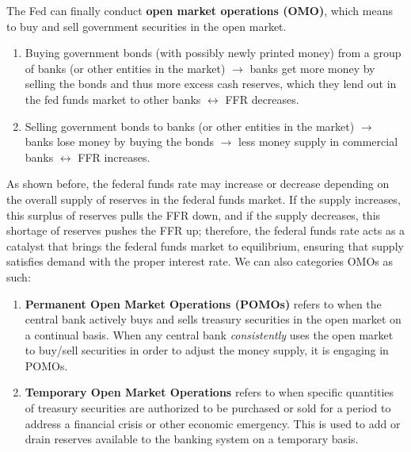 \documentclass{article}
\begin{document}
    \begin{definition}
      \label{def:open-market-operations}
      The Fed can finally conduct \textbf{open market operations (OMO)}, which means to buy and sell government securities in the open market.
      \begin{enumerate}
        \item Buying government bonds (with possibly newly printed money) from a group of banks (or other entities in the market) $\rightarrow$ banks get more money by selling the bonds and thus more excess cash reserves, which they lend out in the fed funds market to other banks $\leftrightarrow$ FFR decreases. 
        \item Selling government bonds to banks (or other entities in the market) $\rightarrow$ banks lose money by buying the bonds $\rightarrow$ less money supply in commercial banks $\leftrightarrow$ FFR increases.
      \end{enumerate}
      As shown before, the federal funds rate may increase or decrease depending on the overall supply of reserves in the federal funds market. If the supply increases, this surplus of reserves pulls the FFR down, and if the supply decreases, this shortage of reserves pushes the FFR up; therefore, the federal funds rate acts as a catalyst that brings the federal funds market to equilibrium, ensuring that supply satisfies demand with the proper interest rate. 
      We can also categories OMOs as such: 
      \begin{enumerate}
          \item \textbf{Permanent Open Market Operations (POMOs)} refers to when the central bank actively buys and sells treasury securities in the open market on a continual basis. When any central bank \textit{consistently} uses the open market to buy/sell securities in order to adjust the money supply, it is engaging in POMOs. 
          \item \textbf{Temporary Open Market Operations} refers to when specific quantities of treasury securities are authorized to be purchased or sold for a period to address a financial crisis or other economic emergency. This is used to add or drain reserves available to the banking system on a temporary basis. 
      \end{enumerate}
    \end{definition}
\end{document}
